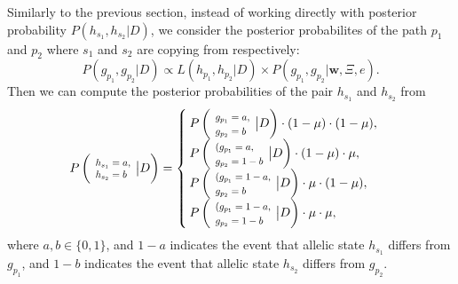 \documentclass{bioinfo}
\newcommand*{\Scale}[2][4]{\scalebox{#1}{$#2$}}%
\begin{document}
Similarly to the previous section, instead of working directly with posterior probability $P(h_{s_1},h_{s_2} | D)$, we consider the posterior probabilites of the path $p_1$ and $p_2$ where $s_1$ and $s_2$ are copying from respectively:
\begin{equation}
P(g_{p_1}, g_{p_2}|D ) \propto L(h_{p_1},h_{p_2} |D) \times P(g_{p_1}, g_{p_2}|\mathbf{w}, \Xi, e).\label{eqn:post.two.LD}
\end{equation}
Then we can compute the posterior probabilities of the pair $h_{s_1}$ and $h_{s_2}$ from
\begin{equation}
P\left(\Scale[0.8]{ \begin{array}{l} h_{s_1} = a, \\h_{s_2} = b \end{array}}\big{|} D\right) =
\begin{cases}
P\left(\Scale[0.8]{ \begin{array}{l} g_{p_1} = a, \\g_{p_2} = b \end{array}} \big{|} D\right) \cdot (1-\mu) \cdot (1-\mu), \\%
P\left(\Scale[0.8]{ \begin{array}{l}(g_{p_1} = a, \\g_{p_2} = 1-b \end{array}}\big{|} D\right) \cdot (1 - \mu) \cdot \mu, \\%
P\left(\Scale[0.8]{ \begin{array}{l}(g_{p_1} = 1-a, \\g_{p_2} = b \end{array}}\big{|} D\right) \cdot \mu \cdot (1 - \mu), \\%
P\left(\Scale[0.8]{ \begin{array}{l}(g_{p_1} = 1-a, \\g_{p_2} = 1-b \end{array}}\big{|} D\right) \cdot \mu \cdot \mu, \\%
\end{cases}
\label{eqn:ps0_pair}
\end{equation}
where $a,b \in \{0, 1\}$, and $1-a$ indicates the event that allelic state $h_{s_1}$ differs from $g_{p_1}$, and $1-b$ indicates the event that allelic state $h_{s_2}$ differs from $g_{p_2}$.
\end{document}
